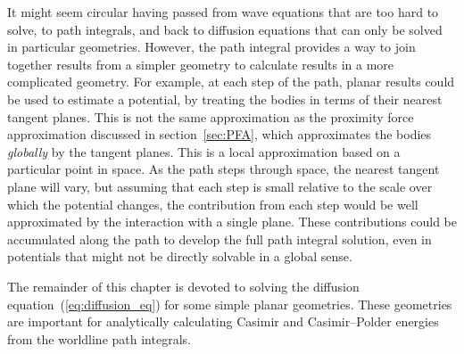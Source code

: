 It might seem circular having passed from wave equations that are too hard to solve, to path integrals,
and back to diffusion equations that can only be solved in particular geometries.
However, the path integral provides a way to join together results from a simpler geometry to calculate
results in a more complicated geometry.
For example, at each step of the path, planar results could be used to estimate a potential,
by treating the bodies in terms of their nearest tangent planes.  
This is not the same approximation as the proximity force approximation discussed in section~\ref{sec:PFA}, 
which approximates the bodies \emph{globally} by the tangent planes. 
This is a local approximation based on a particular point in space.
As the path steps through space, the nearest tangent plane will vary, but assuming that each 
step is small relative to the scale over which the potential changes,
 the contribution from each step would be well approximated by the interaction with a single plane. 
These contributions could be accumulated along the path to develop the full path integral solution,
 even in potentials that might not be directly solvable in a global sense.  


The remainder of this chapter is devoted to solving the diffusion equation~(\ref{eq:diffusion_eq})
for some simple planar geometries.
These geometries are important for analytically calculating Casimir and Casimir--Polder
energies from the worldline path integrals.  
    
